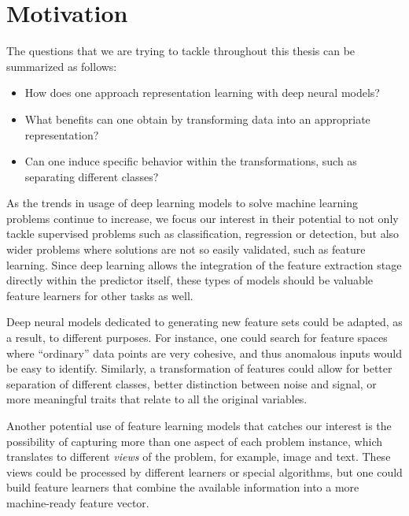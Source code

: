 
\section{Motivation}

The questions that we are trying to tackle throughout this thesis can be summarized as follows:

\begin{itemize}
    \item How does one approach representation learning with deep neural models?
    \item What benefits can one obtain by transforming data into an appropriate representation?
    \item Can one induce specific behavior within the transformations, such as separating different classes?
\end{itemize}



As the trends in usage of deep learning models to solve machine learning problems continue to increase, we focus our interest in their potential to not only tackle supervised problems such as classification, regression or detection, but also wider problems where solutions are not so easily validated, such as feature learning. Since deep learning allows the integration of the feature extraction stage directly within the predictor itself, these types of models should be valuable feature learners for other tasks as well.


Deep neural models dedicated to generating new feature sets could be adapted, as a result, to different purposes. For instance, one could search for feature spaces where ``ordinary'' data points are very cohesive, and thus anomalous inputs would be easy to identify. Similarly, a transformation of features could allow for better separation of different classes, better distinction between noise and signal, or more meaningful traits that relate to all the original variables.


Another potential use of feature learning models that catches our interest is the possibility of capturing more than one aspect of each problem instance, which translates to different \textit{views} of the problem, for example, image and text. These views could be processed by different learners or special algorithms, but one could build feature learners that combine the available information into a more machine-ready feature vector.

